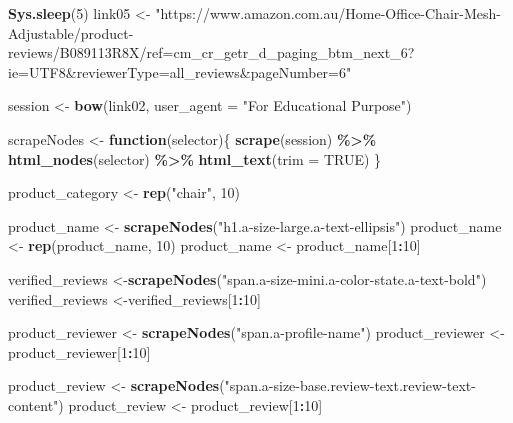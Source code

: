 \documentclass[
]{article}
\newenvironment{Shaded}{\begin{snugshade}}{\end{snugshade}}
\newcommand{\AttributeTok}[1]{\textcolor[rgb]{0.13,0.29,0.53}{#1}}
\newcommand{\ConstantTok}[1]{\textcolor[rgb]{0.56,0.35,0.01}{#1}}
\newcommand{\ControlFlowTok}[1]{\textcolor[rgb]{0.13,0.29,0.53}{\textbf{#1}}}
\newcommand{\DecValTok}[1]{\textcolor[rgb]{0.00,0.00,0.81}{#1}}
\newcommand{\FunctionTok}[1]{\textcolor[rgb]{0.13,0.29,0.53}{\textbf{#1}}}
\newcommand{\NormalTok}[1]{#1}
\newcommand{\OtherTok}[1]{\textcolor[rgb]{0.56,0.35,0.01}{#1}}
\newcommand{\SpecialCharTok}[1]{\textcolor[rgb]{0.81,0.36,0.00}{\textbf{#1}}}
\newcommand{\StringTok}[1]{\textcolor[rgb]{0.31,0.60,0.02}{#1}}
\begin{document}
\begin{Shaded}
\begin{Highlighting}[]
   \FunctionTok{Sys.sleep}\NormalTok{(}\DecValTok{5}\NormalTok{)}
\NormalTok{link05 }\OtherTok{\textless{}{-}} \StringTok{"https://www.amazon.com.au/Home{-}Office{-}Chair{-}Mesh{-}Adjustable/product{-}reviews/B089113R8X/ref=cm\_cr\_getr\_d\_paging\_btm\_next\_6?ie=UTF8\&reviewerType=all\_reviews\&pageNumber=6"}


\NormalTok{  session }\OtherTok{\textless{}{-}} \FunctionTok{bow}\NormalTok{(link02,}
               \AttributeTok{user\_agent =} \StringTok{"For Educational Purpose"}\NormalTok{)}

\NormalTok{  scrapeNodes }\OtherTok{\textless{}{-}} \ControlFlowTok{function}\NormalTok{(selector)\{}
    \FunctionTok{scrape}\NormalTok{(session) }\SpecialCharTok{\%\textgreater{}\%}
      \FunctionTok{html\_nodes}\NormalTok{(selector) }\SpecialCharTok{\%\textgreater{}\%}
      \FunctionTok{html\_text}\NormalTok{(}\AttributeTok{trim =} \ConstantTok{TRUE}\NormalTok{)}
\NormalTok{  \}}

\NormalTok{  product\_category }\OtherTok{\textless{}{-}} \FunctionTok{rep}\NormalTok{(}\StringTok{"chair"}\NormalTok{, }\DecValTok{10}\NormalTok{)}

\NormalTok{  product\_name }\OtherTok{\textless{}{-}} \FunctionTok{scrapeNodes}\NormalTok{(}\StringTok{"h1.a{-}size{-}large.a{-}text{-}ellipsis"}\NormalTok{)}
\NormalTok{  product\_name }\OtherTok{\textless{}{-}} \FunctionTok{rep}\NormalTok{(product\_name, }\DecValTok{10}\NormalTok{)}
\NormalTok{  product\_name }\OtherTok{\textless{}{-}}\NormalTok{ product\_name[}\DecValTok{1}\SpecialCharTok{:}\DecValTok{10}\NormalTok{]}
  
\NormalTok{  verified\_reviews }\OtherTok{\textless{}{-}}\FunctionTok{scrapeNodes}\NormalTok{(}\StringTok{"span.a{-}size{-}mini.a{-}color{-}state.a{-}text{-}bold"}\NormalTok{)}
\NormalTok{  verified\_reviews }\OtherTok{\textless{}{-}}\NormalTok{verified\_reviews[}\DecValTok{1}\SpecialCharTok{:}\DecValTok{10}\NormalTok{]}
  
\NormalTok{  product\_reviewer }\OtherTok{\textless{}{-}} \FunctionTok{scrapeNodes}\NormalTok{(}\StringTok{"span.a{-}profile{-}name"}\NormalTok{)}
\NormalTok{  product\_reviewer }\OtherTok{\textless{}{-}}\NormalTok{ product\_reviewer[}\DecValTok{1}\SpecialCharTok{:}\DecValTok{10}\NormalTok{]}
  
\NormalTok{  product\_review }\OtherTok{\textless{}{-}} \FunctionTok{scrapeNodes}\NormalTok{(}\StringTok{"span.a{-}size{-}base.review{-}text.review{-}text{-}content"}\NormalTok{)}
\NormalTok{  product\_review }\OtherTok{\textless{}{-}}\NormalTok{ product\_review[}\DecValTok{1}\SpecialCharTok{:}\DecValTok{10}\NormalTok{]}
  

\end{Highlighting}
\end{Shaded}
\end{document}
